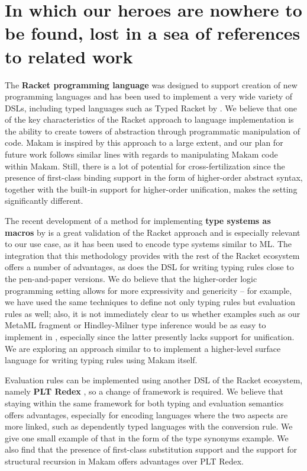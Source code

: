 \section{In which our heroes are nowhere to be found, lost in a sea of
references to related
work}\label{in-which-our-heroes-are-nowhere-to-be-found-lost-in-a-sea-of-references-to-related-work}

\identNormal

The \textbf{Racket programming language} was designed to support
creation of new programming languages \citep{racket-manifesto} and has
been used to implement a very wide variety of DSLs, including typed
languages such as Typed Racket by \citet{typed-racket-main-reference}.
We believe that one of the key characteristics of the Racket approach to
language implementation is the ability to create towers of abstraction
through programmatic manipulation of code. Makam is inspired by this
approach to a large extent, and our plan for future work follows similar
lines with regards to manipulating Makam code within Makam. Still, there
is a lot of potential for cross-fertilization since the presence of
first-class binding support in the form of higher-order abstract syntax,
together with the built-in support for higher-order unification, makes
the \lamprolog
setting significantly different.

The recent development of a method for implementing \textbf{type systems
as macros} by \citet{racket-type-systems-as-macros} is a great
validation of the Racket approach and is especially relevant to our use
case, as it has been used to encode type systems similar to ML. The
integration that this methodology provides with the rest of the Racket
ecosystem offers a number of advantages, as does the
 DSL for writing typing rules close to the
pen-and-paper versions. We do believe that the higher-order logic
programming setting allows for more expressivity and genericity -- for
example, we have used the same techniques to define not only typing
rules but evaluation rules as well; also, it is not immediately clear to
us whether examples such as our MetaML fragment or Hindley-Milner type
inference would be as easy to implement in ,
especially since the latter presently lacks support for unification. We
are exploring an approach similar to  to implement a
higher-level surface language for writing typing rules using Makam
itself.

Evaluation rules can be implemented using another DSL of the Racket
ecosystem, namely \textbf{PLT Redex} \citep{felleisen2009semantics}, so
a change of framework is required. We believe that staying within the
same framework for both typing and evaluation semantics offers
advantages, especially for encoding languages where the two aspects are
more linked, such as dependently typed languages with the conversion
rule. We give one small example of that in the form of the type synonyms
example. We also find that the presence of first-class substitution
support and the support for structural recursion in Makam offers
advantages over PLT Redex.

